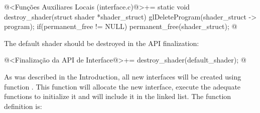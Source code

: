 \iniciocodigo
@<Funções Auxiliares Locais (interface.c)@>+=
static void destroy_shader(struct shader *shader_struct){
  glDeleteProgram(shader_struct -> program);
  if(permanent_free != NULL)
    permanent_free(shader_struct);
}
@
\fimcodigo

The default shader should be destroyed in the API finalization:

\iniciocodigo
@<Finalização da API de Interface@>+=
destroy_shader(default_shader);
@
\fimcodigo


As was described in the Introduction, all new interfaces will be
created using function . This function
will allocate the new interface, execute the adequate functions to
initialize it and will include it in the linked list. The function
definition is:


